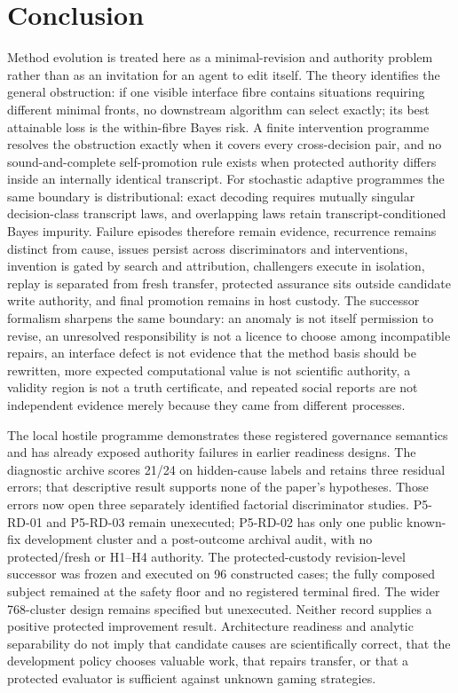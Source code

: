 \section{Conclusion}

Method evolution is treated here as a minimal-revision and authority problem
rather than as an invitation for an agent to edit itself. The theory identifies
the general obstruction: if one visible interface fibre contains situations
requiring different minimal fronts, no downstream algorithm can select exactly;
its best attainable loss is the within-fibre Bayes risk. A finite intervention
programme resolves the obstruction exactly when it covers every cross-decision
pair, and no sound-and-complete self-promotion rule exists when protected
authority differs inside an internally identical transcript. For stochastic
adaptive programmes the same boundary is distributional: exact decoding
requires mutually singular decision-class transcript laws, and overlapping
laws retain transcript-conditioned Bayes impurity. Failure episodes
therefore remain evidence, recurrence remains distinct from cause, issues
persist across discriminators and interventions, invention is gated by search
and attribution, challengers execute in isolation, replay is separated from
fresh transfer, protected assurance sits outside candidate write authority, and
final promotion remains in host custody. The successor formalism sharpens the
same boundary: an anomaly is not itself permission to revise, an unresolved
responsibility is not a licence to choose among incompatible repairs, an
interface defect is not evidence that the method basis should be rewritten,
more expected computational value is not scientific authority, a validity
region is not a truth certificate, and repeated social reports are not
independent evidence merely because they came from different processes.

The local hostile programme demonstrates these registered governance semantics
and has already exposed authority failures in earlier readiness designs. The
diagnostic archive scores 21/24 on hidden-cause labels and retains three
residual errors; that descriptive result supports none of the paper's
hypotheses. Those errors now open three separately identified factorial
discriminator studies. P5-RD-01 and P5-RD-03 remain unexecuted; P5-RD-02 has
only one public known-fix development cluster and a post-outcome archival audit,
with no protected/fresh or H1--H4 authority. The protected-custody
revision-level successor was frozen and executed on 96 constructed cases; the
fully composed subject remained at the safety floor and no registered terminal
fired. The wider 768-cluster design remains specified but unexecuted. Neither
record supplies a positive protected improvement result. Architecture
readiness and analytic separability do not imply that candidate causes are
scientifically correct, that the development policy chooses valuable work,
that repairs transfer, or that a protected evaluator is sufficient against
unknown gaming strategies.

